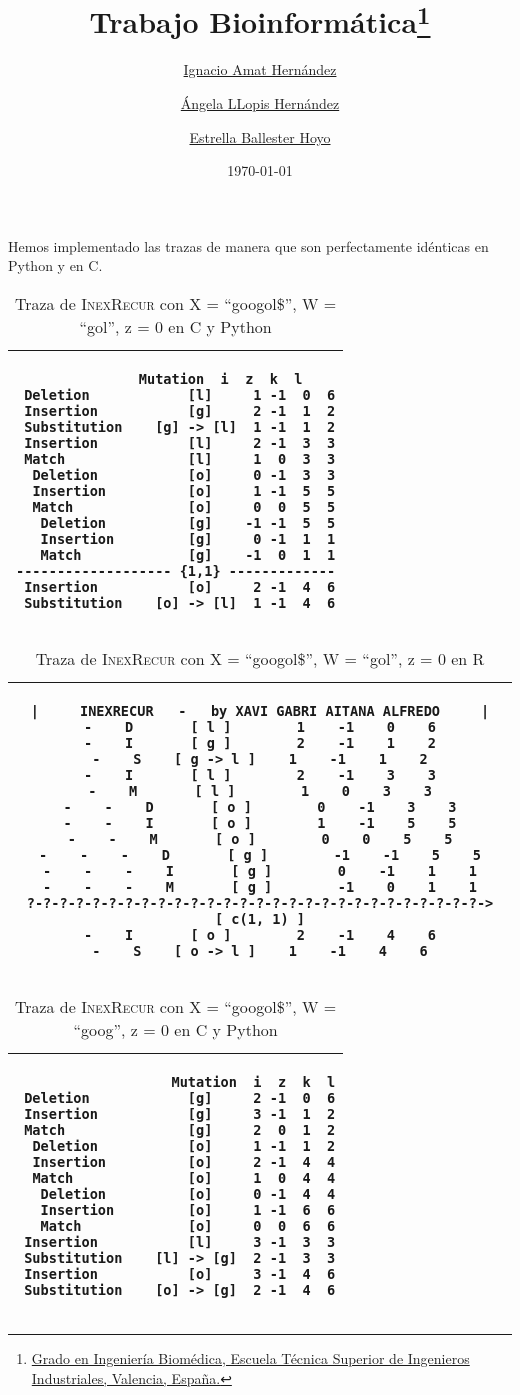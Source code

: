 \documentclass{article}
\title{\textbf{Trabajo Bioinform\'atica}\thanks{\href{https://www.upv.es/titulaciones/GIB/indexc.html}{Grado en Ingeniería Biomédica, Escuela Técnica Superior de Ingenieros Industriales, Valencia, España.}}}
\date{\today}
\author{
     \href{mailto:igamher@etsid.upv.es}{Ignacio Amat Hernández}
\and \href{mailto:ngellohe@etsii.upv.es}{Ángela LLopis Hernández}
\and \href{mailto:esbalho@etsii.upv.es}{Estrella Ballester Hoyo}
}
\newcommand{\tempcaption}{}
\newenvironment{code}[4]
{
\begin{table}[h!]
\gdef\tempcaption{Traza de \textsc{InexRecur} con X = ``#1'', W = ``#2'', z = #3 en #4}
\centering
\begin{tabular}{|c|}
\hline
}
{
\\\hline
\end{tabular}
\caption{\tempcaption}
\end{table}
}
\begin{document}
\maketitle

\newpage
\phantom{}
\vfill
Hemos implementado las trazas de manera que son perfectamente
idénticas en Python y en C.\\

\begin{code}{googol\$}{gol}{0}{C y Python}
\begin{lstlisting}
		   Mutation  i  z  k  l
 Deletion            [l]     1 -1  0  6
 Insertion           [g]     2 -1  1  2
 Substitution    [g] -> [l]  1 -1  1  2
 Insertion           [l]     2 -1  3  3
 Match               [l]     1  0  3  3
  Deletion           [o]     0 -1  3  3
  Insertion          [o]     1 -1  5  5
  Match              [o]     0  0  5  5
   Deletion          [g]    -1 -1  5  5
   Insertion         [g]     0 -1  1  1
   Match             [g]    -1  0  1  1
------------------- {1,1} -------------
 Insertion           [o]     2 -1  4  6
 Substitution    [o] -> [l]  1 -1  4  6
\end{lstlisting}
\end{code}
\vfill
\begin{code}{googol\$}{gol}{0}{R}
\begin{lstlisting}
|     INEXRECUR   -   by XAVI GABRI AITANA ALFREDO     |
-    D       [ l ]        1    -1    0    6
-    I       [ g ]        2    -1    1    2
-    S    [ g -> l ]    1    -1    1    2
-    I       [ l ]        2    -1    3    3
-    M       [ l ]        1    0    3    3
-    -    D       [ o ]        0    -1    3    3
-    -    I       [ o ]        1    -1    5    5
-    -    M       [ o ]        0    0    5    5
-    -    -    D       [ g ]        -1    -1    5    5
-    -    -    I       [ g ]        0    -1    1    1
-    -    -    M       [ g ]        -1    0    1    1
?-?-?-?-?-?-?-?-?-?-?-?-?-?-?-?-?-?-?-?-?-?-?-?-?-?-?-?->  [ c(1, 1) ]
-    I       [ o ]        2    -1    4    6
-    S    [ o -> l ]    1    -1    4    6
\end{lstlisting}
\end{code}
\vfill
\newpage
\phantom{}
\vfill
\begin{code}{googol\$}{goog}{0}{C y Python}
\begin{lstlisting}
                   Mutation  i  z  k  l
 Deletion            [g]     2 -1  0  6
 Insertion           [g]     3 -1  1  2
 Match               [g]     2  0  1  2
  Deletion           [o]     1 -1  1  2
  Insertion          [o]     2 -1  4  4
  Match              [o]     1  0  4  4
   Deletion          [o]     0 -1  4  4
   Insertion         [o]     1 -1  6  6
   Match             [o]     0  0  6  6
 Insertion           [l]     3 -1  3  3
 Substitution    [l] -> [g]  2 -1  3  3
 Insertion           [o]     3 -1  4  6
 Substitution    [o] -> [g]  2 -1  4  6
\end{lstlisting}
\end{code}
\end{document}
